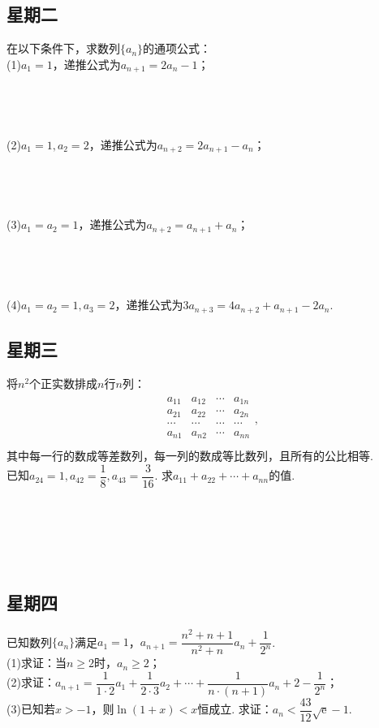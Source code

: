 \documentclass[UTF8,a4paper,11 pt]{ctexart}%
\newcommand\eu{\mathrm{e}}%
\begin{document}
	\subsection{星期二}\noindent
	在以下条件下，求数列$ \{a_n\} $的通项公式：
	\\(1)\:$ a_1=1 $，递推公式为$ a_{n+1}=2a_n-1 $；\\\,\\\,\\\,\\\,
	\\(2)\:$ a_1=1,a_2=2 $，递推公式为$ a_{n+2}=2a_{n+1}-a_n $；\\\,\\\,\\\,\\\,
	\\(3)\:$ a_1=a_2=1$，递推公式为$ a_{n+2}=a_{n+1}+a_n $；\\\,\\\,\\\,\\\,
	\\(4)\:$ a_1=a_2=1, a_3=2$，递推公式为$ 3a_{n+3}=4a_{n+2}+a_{n+1}-2a_n $.
	\clearpage\subsection{星期三}\noindent
	将$ n^2 $个正实数排成$ n $行$ n $列：
	\begin{align*}
		\begin{matrix}
			a_{11} & a_{12} & \cdots & a_{1n}\\
			a_{21} & a_{22} & \cdots & a_{2n}\\
			\cdots & \cdots & \cdots & \cdots\\
			a_{n1} & a_{n2} & \cdots & a_{nn}\\
		\end{matrix},
	\end{align*}其中每一行的数成等差数列，每一列的数成等比数列，且所有的公比相等.
	\\已知$ a_{24}=1 ,a_{42}=\dfrac{1}{8},a_{43}=\dfrac{3}{16}$. 求$ a_{11}+a_{22}+\cdots+a_{nn} $的值.
	\\\,\\\,\\\,\\\,\\\,
	\subsection{星期四}\noindent
	已知数列$ \{a_n\} $满足$ a_1=1 $，$ a_{n+1}=\dfrac{n^2+n+1}{n^2+n}a_n+\dfrac{1}{2^n} $.
	\\(1)求证：当$ n\ge2 $时，$ a_n\ge2 $；
	\\(2)求证：$ a_{n+1}=\dfrac{1}{1\cdot2}a_1+\dfrac{1}{2\cdot3}a_2+\cdots+\dfrac{1}{n\cdot(n+1)}a_n+2-\dfrac{1}{2^n} $；
	\\(3)已知若$ x>-1 $，则$ \ln(1+x)<x $恒成立. 求证：$ a_n<\dfrac{43}{12}\sqrt{\eu}-1 $.\\\,\\\,\\\,\\\,\\\,\\\,
\end{document}
